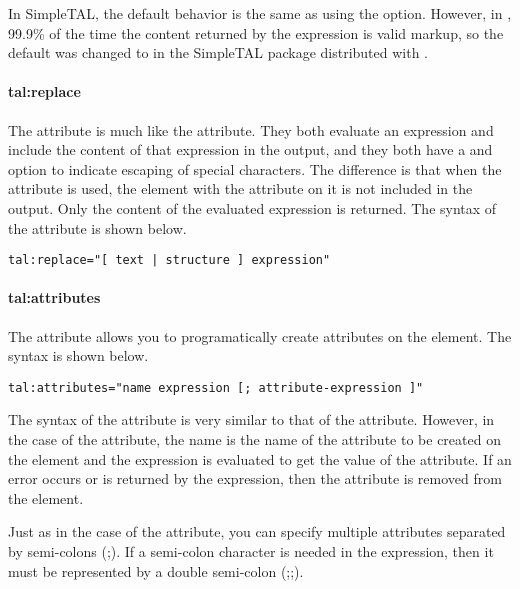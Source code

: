 In SimpleTAL, the default
behavior is the same as using the  option.  However, in 
\plasTeX, 99.9\% of the time the content returned by the expression is
valid markup, so the default was changed to  in the 
SimpleTAL package distributed with \plasTeX.


\paragraph{tal:replace}

The  attribute is much like the 
attribute.  They both evaluate an expression and include the content
of that expression in the output, and they both have a  and
 option to indicate escaping of special characters.
The difference is that when the  attribute is used,
the element with the  attribute on it is not included
in the output.  Only the content of the evaluated expression is returned.
The syntax of the  attribute is shown below.
\begin{verbatim}
tal:replace="[ text | structure ] expression"
\end{verbatim}


\paragraph{tal:attributes}

The  attribute allows you to programatically create
attributes on the element.  The syntax is shown below.
\begin{verbatim}
tal:attributes="name expression [; attribute-expression ]"
\end{verbatim}

The syntax of the  attribute is very similar to
that of the  attribute.  However, in the case of the
 attribute, the name is the name of the attribute
to be created on the element and the expression is evaluated to
get the value of the attribute.  If an error occurs or  is 
returned by the expression, then the attribute is removed from the 
element.

Just as in the case of the  attribute, you can specify
multiple attributes separated by semi-colons (;).  If a semi-colon character
is needed in the expression, then it must be represented by a double
semi-colon (;;).

